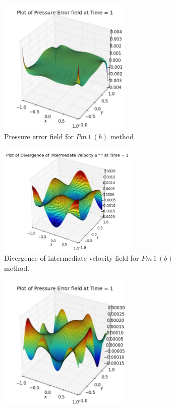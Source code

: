 \begin{figure}[H]
	\centering
	\begin{subfigure}[t]{2.5in}
		\centering
		\includegraphics[width=2.5in]{figures/Pm1b_pf2_np_P_error_t_1_grid_120.jpg}
		\caption{Pressure error field for $Pm\,1\,(b)$ method}\label{fig:6.19a}		
	\end{subfigure}
	\quad
	\begin{subfigure}[t]{2.6in}
		\centering
		\includegraphics[width=2.6in]{figures/Pm1b_pf2_np_div_uvstar_t_1_grid_120.jpg}
		\caption{Divergence of intermediate velocity field for $Pm\,1\,(b)$ method. }\label{fig:6.19b}
	\end{subfigure}
	\quad
	\centering
	\begin{subfigure}[t]{2.5in}
		\centering
		\includegraphics[width=2.5in]{figures/Pm2_pf2_cN_np_P_error_t_1_grid_120.jpg}

\end{subfigure}
\end{figure}
